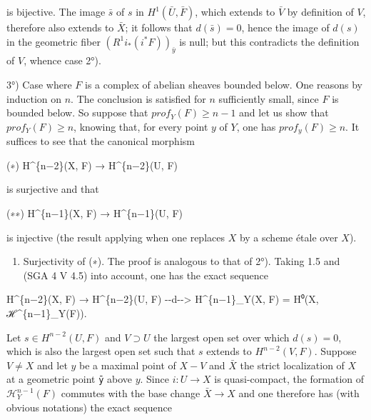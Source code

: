 \documentclass[
  11pt,
  a4paper,
]{book}
\newenvironment{Shaded}{}{}
\newcommand{\NormalTok}[1]{#1}
\providecommand{\tightlist}{%
  \setlength{\itemsep}{0pt}\setlength{\parskip}{0pt}}
\begin{document}
is bijective. The image \(\bar{s}\) of \(s\) in
\(H^{1}(\bar{U}, \bar{F})\), which extends to \(\bar{V}\) by definition
of \(V\), therefore also extends to \(\bar{X}\); it follows that
\(d(\bar{s}) = 0\), hence the image of \(d(s)\) in the geometric fiber
\((R^{1} i_{*} (i^{*} F))_{\bar{y}}\) is null; but this contradicts the
definition of \(V\), whence case 2°).

3°) Case where \(F\) is a complex of abelian sheaves bounded below. One
reasons by induction on \(n\). The conclusion is satisfied for \(n\)
sufficiently small, since \(F\) is bounded below. So suppose that
\(prof_{Y}(F) \geqslant n - 1\) and let us show that
\(prof_{Y}(F) \geqslant n\), knowing that, for every point \(y\) of
\(Y\), one has \(prof_{y}(F) \geqslant n\). It suffices to see that the
canonical morphism

\begin{Shaded}
\begin{Highlighting}[]
\NormalTok{(∗)    H\^{}\{n−2\}(X, F) → H\^{}\{n−2\}(U, F)}
\end{Highlighting}
\end{Shaded}

is surjective and that

\begin{Shaded}
\begin{Highlighting}[]
\NormalTok{(∗∗)   H\^{}\{n−1\}(X, F) → H\^{}\{n−1\}(U, F)}
\end{Highlighting}
\end{Shaded}

is injective (the result applying when one replaces \(X\) by a scheme
étale over \(X\)).

\begin{enumerate}
\def\labelenumi{\alph{enumi})}
\tightlist
\item
  Surjectivity of (∗). The proof is analogous to that of 2°). Taking 1.5
  and (SGA 4 V 4.5) into account, one has the exact sequence
\end{enumerate}

\begin{Shaded}
\begin{Highlighting}[]
\NormalTok{H\^{}\{n−2\}(X, F) → H\^{}\{n−2\}(U, F) {-}{-}d{-}{-}\textgreater{} H\^{}\{n−1\}\_Y(X, F) = H⁰(X, ℋ\^{}\{n−1\}\_Y(F)).}
\end{Highlighting}
\end{Shaded}

Let \(s \in H^{n-2}(U, F)\) and \(V \supset U\) the largest open set
over which \(d(s) = 0\), which is also the largest open set such that
\(s\) extends to \(H^{n-2}(V, F)\). Suppose \(V \neq X\) and let \(y\)
be a maximal point of \(X - V\) and \(\bar{X}\) the strict localization
of \(X\) at a geometric point \texttt{ȳ} above \(y\). Since
\(i : U \to X\) is quasi-compact, the formation of
\(\mathcal{H}^{n-1}_{Y}(F)\) commutes with the base change
\(\bar{X} \to X\) and one therefore has (with obvious notations) the
exact sequence
\end{document}
